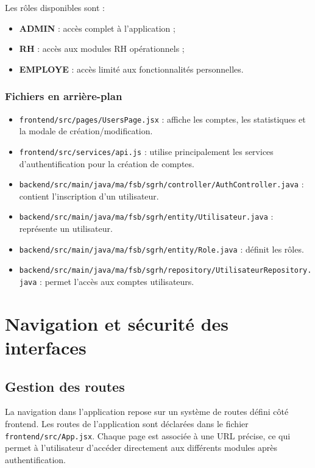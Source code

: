 \documentclass[12pt,a4paper]{report}
\begin{document}
Les rôles disponibles sont :
\begin{itemize}
    \item \textbf{ADMIN} : accès complet à l'application ;
    \item \textbf{RH} : accès aux modules RH opérationnels ;
    \item \textbf{EMPLOYE} : accès limité aux fonctionnalités personnelles.
\end{itemize}

\subsection{Fichiers en arrière-plan}

\begin{itemize}
    \item \texttt{frontend/src/pages/UsersPage.jsx} : affiche les comptes, les statistiques et la modale de création/modification.
    \item \texttt{frontend/src/services/api.js} : utilise principalement les services d'authentification pour la création de comptes.
    \item \texttt{backend/src/main/java/ma/fsb/sgrh/controller/AuthController.java} : contient l'inscription d'un utilisateur.
    \item \texttt{backend/src/main/java/ma/fsb/sgrh/entity/Utilisateur.java} : représente un utilisateur.
    \item \texttt{backend/src/main/java/ma/fsb/sgrh/entity/Role.java} : définit les rôles.
    \item \texttt{backend/src/main/java/ma/fsb/sgrh/repository/UtilisateurRepository.java} : permet l'accès aux comptes utilisateurs.
\end{itemize}

\chapter{Navigation et sécurité des interfaces}

\section{Gestion des routes}

La navigation dans l'application repose sur un système de routes défini côté frontend. Les routes de l'application sont déclarées dans le fichier \texttt{frontend/src/App.jsx}. Chaque page est associée à une URL précise, ce qui permet à l'utilisateur d'accéder directement aux différents modules après authentification.
\end{document}
